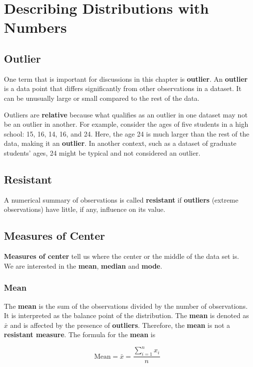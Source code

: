 \chapter{Describing Distributions with Numbers}

\section{Outlier}
One term that is important for discussions in this chapter is \textbf{outlier}. An \textbf{outlier} is a data point that differs significantly from other observations in a dataset. It can be unusually large or small compared to the rest of the data.

Outliers are \textbf{relative} because what qualifies as an outlier in one dataset may not be an outlier in another. For example, consider the ages of five students in a high school: 15, 16, 14, 16, and 24. Here, the age 24 is much larger than the rest of the data, making it an \textbf{outlier}. In another context, such as a dataset of graduate students’ ages, 24 might be typical and not considered an outlier.

\section{Resistant}
A numerical summary of observations is called \textbf{resistant} if \textbf{outliers} (extreme observations) have little, if any, influence on its value.

\section{Measures of Center}
\textbf{Measures of center} tell us where the center or the middle of the data set is. We are interested in the \textbf{mean}, \textbf{median} and \textbf{mode}.

\subsection{Mean}
The \textbf{mean} is the sum of the observations divided by the number of observations. It is interpreted as the balance point of the distribution. The \textbf{mean} is denoted as $\bar{x}$ and is affected by the presence of \textbf{outliers}. Therefore, the \textbf{mean} is not a \textbf{resistant measure}. The formula for the \textbf{mean} is

\[
\text{Mean} = \bar{x} = \frac{\sum_{i=1}^n x_i}{n}
\]

